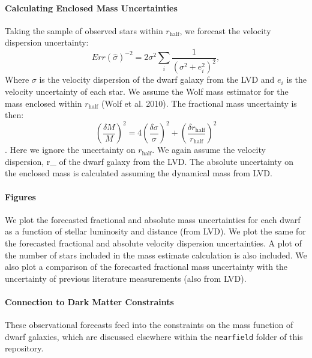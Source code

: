 \paragraph{Calculating Enclosed Mass Uncertainties}
Taking the sample of observed stars within $r_\text{half}$, we forecast the velocity dispersion uncertainty:
\begin{equation}
Err(\hat \sigma)^{-2} = 2 \sigma^2 \sum_i \frac{1}{(\sigma^2+e_i^2)^2},
\end{equation}
Where $\sigma$ is the velocity dispersion of the dwarf galaxy from the LVD and $e_i$ is the velocity uncertainty of each star. We assume the Wolf mass estimator for the mass enclosed within $r_\text{half}$ (Wolf et al. 2010).  The fractional mass uncertainty is then:
\begin{equation}
\left(\frac{\delta M}{M}\right)^2 = 4 \left(\frac{\delta \sigma}{\sigma}\right)^2 + \left(\frac{\delta r_\text{half}}{r_\text{half}}\right)^2
\end{equation}.
Here we ignore the uncertainty on $r_\text{half}$. We again assume the velocity dispersion, r_ of the dwarf galaxy from the LVD. The absolute uncertainty on the enclosed mass is calculated assuming the dynamical mass from LVD. 

\paragraph{Figures}
We plot the forecasted fractional and absolute mass uncertainties for each dwarf as a function of stellar luminosity and distance (from LVD). We plot the same for the forecasted fractional and absolute velocity dispersion uncertainties. A plot of the number of stars included in the mass estimate calculation is also included. We also plot a comparison of the forecasted fractional mass uncertainty with the uncertainty of previous literature measurements (also from LVD). 

\paragraph{Connection to Dark Matter Constraints}
These observational forecasts feed into the constraints on the mass function of dwarf galaxies, which are discussed elsewhere within the \texttt{nearfield} folder of this repository.
